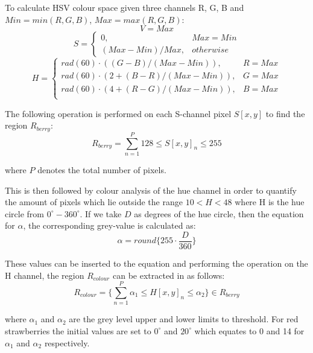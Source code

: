 \documentclass[fleqn,twoside,12pt]{report}
\begin{document}
To calculate HSV colour space given three channels R, G, B and $Min = min(R, G, B)$, $Max = max(R, G, B)$:
\begin{equation}
	V = Max
\end{equation}
\begin{equation}
	S = 
	\begin{cases} 
		0, & Max=Min \\   
		(Max-Min)/Max, & otherwise        
	\end{cases}
\end{equation}
\begin{equation}
H = 
\begin{cases} 
rad(60) \cdot ((G-B)/(Max-Min)), & R=Max \\
rad(60) \cdot (2 + (B-R)/(Max-Min)), & G=Max \\
rad(60) \cdot (4 + (R-G)/(Max-Min)), & B=Max \\   
\end{cases}
\end{equation}



The following operation is performed on each S-channel pixel $S[x,y]$ to find the region $R_{berry}$:
\begin{equation}
R_{berry} = \sum_{n=1}^{P} 128 \leq S[x,y]_n \leq 255
\end{equation}

where $P$ denotes the total number of pixels. 



This is then followed by colour analysis of the hue channel in order to quantify the amount of pixels which lie outside the range $10<H<48$ where H is the hue circle from $0^{\circ}-360^{\circ}$. If we take $D$ as degrees of the hue circle, then the equation for $\alpha$, the corresponding grey-value is calculated as:
\begin{equation}
\alpha = round\Big\{255\cdot \frac{D}{360}\Big\}
\end{equation}


These values can be inserted to the equation and performing the operation on the H channel, the region $R_{colour}$ can be extracted in as follows:
\begin{equation}
R_{colour} = \bigg\{\sum_{n=1}^{P} \alpha_1 \leq H[x,y]_n \leq \alpha_2\bigg\} \in R_{berry}
\end{equation}


where $\alpha_1$ and $\alpha_2$ are the grey level upper and lower limits to threshold. For red strawberries the initial values are set to $0^{\circ}$ and $20^{\circ}$ which equates to 0 and 14 for $\alpha_1$ and $\alpha_2$ respectively.
\end{document}
